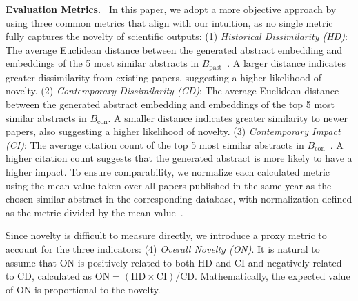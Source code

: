 \documentclass[11pt]{article}
\begin{document}
\noindent \textbf{Evaluation Metrics.}~
In this paper, we adopt a more objective approach by using three common metrics that align with our intuition, as no single metric fully captures the novelty of scientific outputs:
(1) \textit{Historical Dissimilarity (HD)}: The average Euclidean distance between the generated abstract embedding and embeddings of the 5 most similar abstracts in $B_{\text{past}}$~\citep{shao2020bert, zhou2024fine}. A larger distance indicates greater dissimilarity from existing papers, suggesting a higher likelihood of novelty.
(2) \textit{Contemporary Dissimilarity (CD)}: The average Euclidean distance between the generated abstract embedding and embeddings of the top 5 most similar abstracts in $B_{\text{con}}$. A smaller distance indicates greater similarity to newer papers, also suggesting a higher likelihood of novelty. 
(3) \textit{Contemporary Impact (CI)}: The average citation count of the top 5 most similar abstracts in $B_{\text{con}}$~\citep{yang2022gender}. A higher citation count suggests that the generated abstract is more likely to have a higher impact. 
To ensure comparability, we normalize each calculated metric using the mean value taken over all papers published in the same year as the chosen similar abstract in the corresponding database, with normalization defined as the metric divided by the mean value~\citep{alshebli2018preeminence}.

Since novelty is difficult to measure directly, we introduce a proxy metric to account for the three indicators: (4) \textit{Overall Novelty (ON)}. It is natural to assume that ON is positively related to both HD and CI and negatively related to CD, calculated as $\text{ON} = (\text{HD} \times \text{CI})/{\text{CD}}$. Mathematically, the expected value of ON is proportional to the novelty. 
\end{document}
